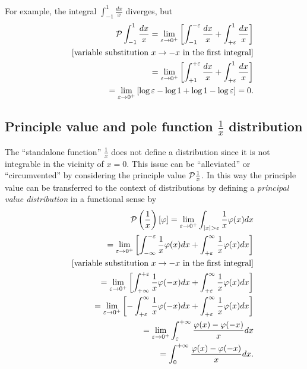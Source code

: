 {
\color{blue}
\bexample
For example, the integral
$ \int_{-1}^1 \frac{dx}{x}$ diverges, but
\begin{equation}
\begin{split}
{\cal P}
\int_{-1}^1 \frac{dx}{x}
= \lim_{\varepsilon \rightarrow 0^+}
\left[
\int_{-1}^{ -\varepsilon}\frac{dx}{x}
+
\int_{ +\varepsilon}^{1} \frac{dx}{x}
\right]
\\
\qquad
[\textrm{variable substitution }x\rightarrow -x \textrm{ in the first integral}]
\\
\qquad
=
\lim_{\varepsilon \rightarrow 0^+}
\left[
\int_{+1}^{ +\varepsilon}\frac{dx}{x}
+
\int_{ +\varepsilon}^{1} \frac{dx}{x}
\right]
\\
\qquad
=
\lim_{\varepsilon \rightarrow 0^+}
\left[
\log \varepsilon - \log 1  + \log 1  - \log \varepsilon
\right]
=0.
\end{split}
\end{equation}
\eexample
}

\subsection{Principle value and pole function $\frac{1}{x}$ distribution}

The ``standalone function'' $\frac{1}{x}$
does not define a distribution  since it is not integrable in
the vicinity of $x=0$.
This issue can be ``alleviated'' or ``circumvented''  by considering the principle value  ${\cal P}\frac{1}{x}$.
In this way the
principle value can be transferred to the context of distributions
by defining
a {\em principal value distribution} in a functional sense by
\begin{equation}
\begin{split}
{\cal P} \left(\frac{1}{x}\right) \left[\varphi\right]
=
\lim_{\varepsilon \rightarrow 0^+}
\int_{ \vert x \vert > \varepsilon }   \frac{1}{x}\varphi(x) dx
\\
\qquad
= \lim_{\varepsilon \rightarrow 0^+}
\left[
\int_{-\infty}^{ -\varepsilon} \frac{1}{x}\varphi(x) dx
+
\int_{ +\varepsilon}^{\infty} \frac{1}{x}\varphi(x) dx
\right]
\\
\qquad
[\textrm{variable substitution }x\rightarrow -x \textrm{ in the first integral}]
\\
\qquad
= \lim_{\varepsilon \rightarrow 0^+}
\left[
\int_{+\infty}^{ +\varepsilon} \frac{1}{x}\varphi(-x) dx
+
\int_{ +\varepsilon}^{\infty} \frac{1}{x}\varphi(x) dx
\right]
\\
\qquad
= \lim_{\varepsilon \rightarrow 0^+}
\left[
-\int_{ +\varepsilon}^{\infty} \frac{1}{x}\varphi(-x) dx
+
\int_{ +\varepsilon}^{\infty} \frac{1}{x}\varphi(x) dx
\right]
\\
\qquad
=
\lim_{\varepsilon \rightarrow 0^+}
\int_{\varepsilon}^{+\infty}   \frac{\varphi(x)-\varphi(-x)}{x} dx
\\
\qquad
=
\int_{0}^{+\infty}   \frac{\varphi(x)-\varphi(-x)}{x} dx
.
\end{split}
\label{2012-m-ch-di-prinvaldi}
\end{equation}



